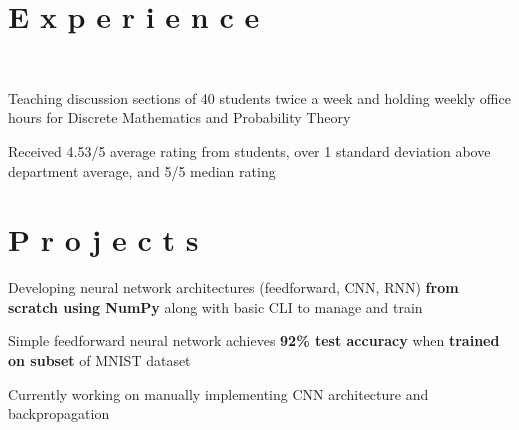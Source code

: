 \documentclass[]{deedy-resume-openfont}
\begin{document}
\begin{minipage}[t]{0.66\textwidth} 


\section{E x p e r i e n c e}
\vspace{4pt}
 \\
\vspace{\topsep} %
\beforetightemize{} %
\begin{tightemize}
\item Teaching discussion sections of 40 students twice a week and holding weekly office hours for Discrete Mathematics and Probability Theory
\item Received 4.53/5 average rating from students, over 1 standard deviation above department average, and 5/5 median rating
\end{tightemize}
\vspace{4pt}


\section{P r o j e c t s}
\vspace{4pt}
\begin{tightemize}
\item Developing neural network architectures (feedforward, CNN, RNN) \textbf{from scratch using NumPy} along with basic CLI to manage and train
\item Simple feedforward neural network achieves \textbf{92\% test accuracy} when \textbf{trained on subset} of MNIST dataset
\item Currently working on manually implementing CNN architecture and backpropagation
\end{tightemize}
\sectionsep


\end{minipage}
\end{document}
